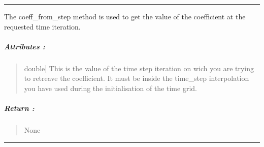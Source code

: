 \documentclass[letterpaper,10pt,english]{sphinxmanual}
\begin{document}
\bigskip\hrule\bigskip


\begin{fulllineitems}
\label{\detokenize{GRID_doc/TIME_GRID_doc:SL_C0de.grid.TIME_GRID.coeff_from_step}}
\pysigstartsignatures
{}
\pysigstopsignatures
\sphinxAtStartPar
The \label{\detokenize{GRID_doc/TIME_GRID_doc:coeff-from-step}}coeff\_from\_step method is used to get the value of the coefficient at the requested time iteration.


\subparagraph{Attributes :}
\label{\detokenize{GRID_doc/TIME_GRID_doc:id8}}\begin{quote}
\begin{description}
\sphinxlineitem{t\_it}{[}double{]}
\sphinxAtStartPar
This is the value of the time step iteration on wich you are trying to retreave the coefficient. It must be inside the time\_step interpolation you have used during the initialisation of the time grid.

\end{description}
\end{quote}


\subparagraph{Return :}
\label{\detokenize{GRID_doc/TIME_GRID_doc:id9}}\begin{quote}

\sphinxAtStartPar
None
\end{quote}

\end{fulllineitems}



\bigskip\hrule\bigskip

\end{document}
